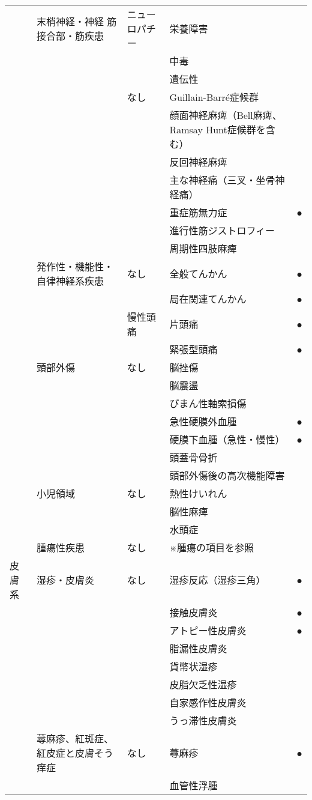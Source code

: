 \begin{xltabular}{\linewidth}{XXXXX}
 & 末梢神経・神経 筋接合部・筋疾患 & ニューロパチー & 栄養障害 &  \\
 &  &  & 中毒 &  \\
 &  &  & 遺伝性 &  \\
 &  & なし & Guillain-Barré症候群 &  \\
 &  &  & 顔面神経麻痺（Bell麻痺、Ramsay Hunt症候群を含む） &  \\
 &  &  & 反回神経麻痺 &  \\
 &  &  & 主な神経痛（三叉・坐骨神経痛） &  \\
 &  &  & 重症筋無力症 & ● \\
 &  &  & 進行性筋ジストロフィー &  \\
 &  &  & 周期性四肢麻痺 &  \\
 & 発作性・機能性・自律神経系疾患 & なし & 全般てんかん & ● \\
 &  &  & 局在関連てんかん & ● \\
 &  & 慢性頭痛 & 片頭痛 & ● \\
 &  &  & 緊張型頭痛 & ● \\
 & 頭部外傷 & なし & 脳挫傷 &  \\
 &  &  & 脳震盪 &  \\
 &  &  & びまん性軸索損傷 &  \\
 &  &  & 急性硬膜外血腫 & ● \\
 &  &  & 硬膜下血腫（急性・慢性） & ● \\
 &  &  & 頭蓋骨骨折 &  \\
 &  &  & 頭部外傷後の高次機能障害 &  \\
 & 小児領域 & なし & 熱性けいれん &  \\
 &  &  & 脳性麻痺 &  \\
 &  &  & 水頭症 &  \\
 & 腫瘍性疾患 & なし & ※腫瘍の項目を参照 &  \\
皮膚系 & 湿疹・皮膚炎 & なし & 湿疹反応（湿疹三角） & ● \\
 &  &  & 接触皮膚炎 & ● \\
 &  &  & アトピー性皮膚炎 & ● \\
 &  &  & 脂漏性皮膚炎 &  \\
 &  &  & 貨幣状湿疹 &  \\
 &  &  & 皮脂欠乏性湿疹 &  \\
 &  &  & 自家感作性皮膚炎 &  \\
 &  &  & うっ滞性皮膚炎 &  \\
 & 蕁麻疹、紅斑症、紅皮症と皮膚そう痒症 & なし & 蕁麻疹 & ● \\
 &  &  & 血管性浮腫 &  \\

\end{xltabular}
